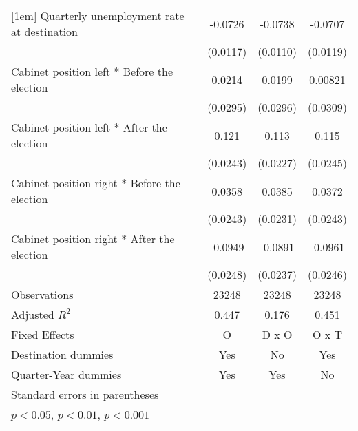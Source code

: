 \begin{table}[htbp]
\begin{tabular}{l*{3}{c}}
[1em]
Quarterly unemployment rate at destination&     -0.0726\sym{***}&     -0.0738\sym{***}&     -0.0707\sym{***}\\
                    &    (0.0117)         &    (0.0110)         &    (0.0119)         \\
[1em]
Cabinet position left * Before the election&      0.0214         &      0.0199         &     0.00821         \\
                    &    (0.0295)         &    (0.0296)         &    (0.0309)         \\
[1em]
Cabinet position left * After the election&       0.121\sym{***}&       0.113\sym{***}&       0.115\sym{***}\\
                    &    (0.0243)         &    (0.0227)         &    (0.0245)         \\
[1em]
Cabinet position right * Before the election&      0.0358         &      0.0385         &      0.0372         \\
                    &    (0.0243)         &    (0.0231)         &    (0.0243)         \\
[1em]
Cabinet position right * After the election&     -0.0949\sym{***}&     -0.0891\sym{***}&     -0.0961\sym{***}\\
                    &    (0.0248)         &    (0.0237)         &    (0.0246)         \\
\hline
Observations        &       23248         &       23248         &       23248         \\
Adjusted \(R^{2}\)  &       0.447         &       0.176         &       0.451         \\
Fixed Effects       &           O         &       D x O         &       O x T         \\
Destination dummies &         Yes         &          No         &         Yes         \\
Quarter-Year dummies&         Yes         &         Yes         &          No         \\
\hline\hline
\multicolumn{4}{l}{\footnotesize Standard errors in parentheses}\\
\multicolumn{4}{l}{\footnotesize \sym{*} \(p<0.05\), \sym{**} \(p<0.01\), \sym{***} \(p<0.001\)}\\
\end{tabular}
\end{table}
